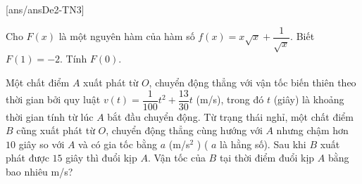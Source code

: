 \TNSA
{}[ans/ansDe2-TN3]
\begin{ex}%
Cho $F(x)$ là một nguyên hàm của hàm số $f(x)=x\sqrt{x}+\dfrac{1}{\sqrt{x}}$. Biết $F(1)=-2$. Tính $F(0)$.
\end{ex}

\begin{ex}%
Một chất điểm $A$ xuất phát từ $O$, chuyển động thẳng với vận tốc biến thiên theo thời gian bởi quy luật $v \left(t\right) = \dfrac{1}{100}t^2 + \dfrac{13}{30}t$ (m/s), trong đó $t$ (giây) là khoảng thời gian tính từ lúc $A$ bắt đầu chuyển động. Từ trạng thái nghỉ, một chất điểm $B$ cũng xuất phát từ $O$, chuyển động thẳng cùng hướng với $A$ nhưng chậm hơn $10$ giây so với $A$ và có gia tốc bằng $a$ (m/s$^2$ ) ( $a$ là hằng số). Sau khi $B$ xuất phát được $15$ giây thì đuổi kịp $A$. Vận tốc của $B$ tại thời điểm đuổi kịp $A$ bằng bao nhiêu m/s?
\end{ex}

